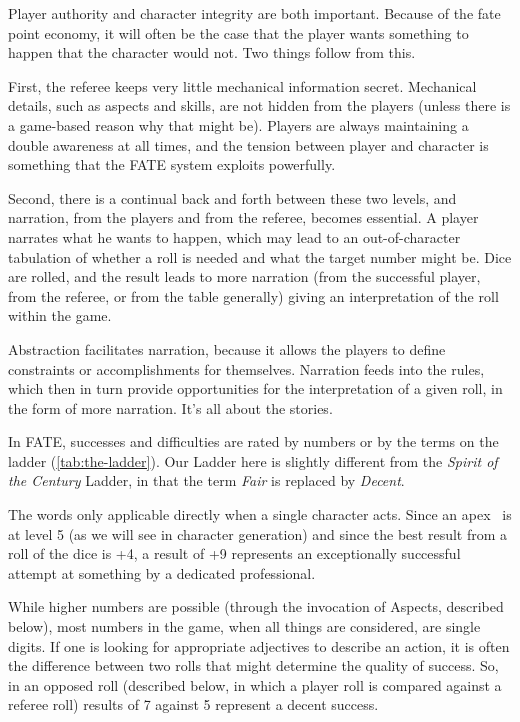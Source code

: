 Player authority and character integrity are both important. Because of the fate point economy, it will often be the case that the player wants something to happen that the character would not. Two things follow from this.

First, the referee keeps very little mechanical information secret. Mechanical details, such as aspects and skills, are not hidden from the players (unless there is a game-based reason why that might be). Players are always maintaining a double awareness at all times, and the tension between player and character is something that the FATE system exploits powerfully.

Second, there is a continual back and forth between these two levels, and narration, from the players and from the referee, becomes essential. A player narrates what he wants to happen, which may lead to an out-of-character tabulation of whether a roll is needed and what the target number might be. Dice are rolled, and the result leads to more narration (from the successful player, from the referee, or from the table generally) giving an interpretation of the roll within the game.

Abstraction facilitates narration, because it allows the players to define constraints or accomplishments for themselves. Narration feeds into the rules, which then in turn provide opportunities for the interpretation of a given roll, in the form of more narration. It's all about the stories.



In FATE, successes and difficulties are rated by numbers or by the terms on the ladder (\autoref{tab:the-ladder}). Our Ladder here is slightly different from the \emph{Spirit of the Century} Ladder, in that the term \emph{Fair} is replaced by \emph{Decent}.

The words only applicable directly when a single character acts. Since an apex \Skill\ is at level 5 (as we will see in character generation) and since the best result from a roll of the dice is +4, a result of +9 represents an exceptionally successful attempt at something by a dedicated professional.

While higher numbers are possible (through the invocation of Aspects, described below), most numbers in the game, when all things are considered, are single digits. If one is looking for appropriate adjectives to describe an action, it is often the difference between two rolls that might determine the quality of success. So, in an opposed roll (described below, in which a player roll is compared against a referee roll) results of 7 against 5 represent a decent success.
